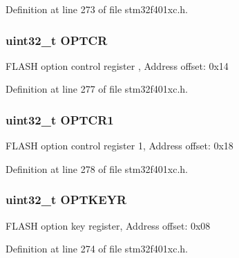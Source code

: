 Definition at line 273 of file stm32f401xc.\+h.

\subsubsection[{\texorpdfstring{O\+P\+T\+CR}{OPTCR}}]{ uint32\+\_\+t O\+P\+T\+CR}\hypertarget{struct_f_l_a_s_h___type_def_acfef9b6d7da4271943edc04d7dfdf595}{}\label{struct_f_l_a_s_h___type_def_acfef9b6d7da4271943edc04d7dfdf595}
F\+L\+A\+SH option control register , Address offset\+: 0x14 

Definition at line 277 of file stm32f401xc.\+h.

\subsubsection[{\texorpdfstring{O\+P\+T\+C\+R1}{OPTCR1}}]{ uint32\+\_\+t O\+P\+T\+C\+R1}\hypertarget{struct_f_l_a_s_h___type_def_a1dddf235f246a1d4e7e5084cd51e2dd0}{}\label{struct_f_l_a_s_h___type_def_a1dddf235f246a1d4e7e5084cd51e2dd0}
F\+L\+A\+SH option control register 1, Address offset\+: 0x18 

Definition at line 278 of file stm32f401xc.\+h.

\subsubsection[{\texorpdfstring{O\+P\+T\+K\+E\+YR}{OPTKEYR}}]{ uint32\+\_\+t O\+P\+T\+K\+E\+YR}\hypertarget{struct_f_l_a_s_h___type_def_afc4900646681dfe1ca43133d376c4423}{}\label{struct_f_l_a_s_h___type_def_afc4900646681dfe1ca43133d376c4423}
F\+L\+A\+SH option key register, Address offset\+: 0x08 

Definition at line 274 of file stm32f401xc.\+h.

